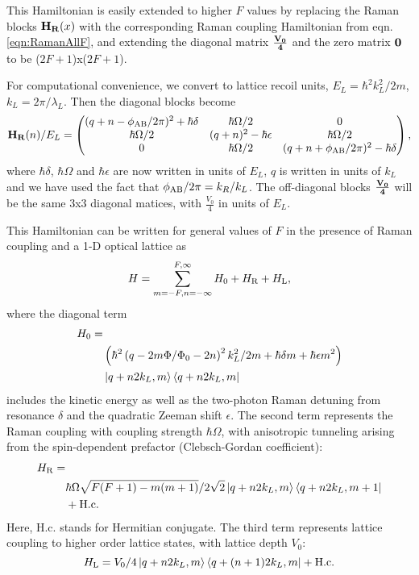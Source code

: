 This Hamiltonian is easily extended to higher $F$ values by replacing the Raman blocks ${\bf H_R}(x)$ with the corresponding Raman coupling Hamiltonian from eqn. \ref{eqn:RamanAllF}, and extending the diagonal matrix  ${\bf \frac{V_0}{4}}$ and the zero matrix $\bf 0$ to be ($2F+1$)x($2F+1$).

For computational convenience, we convert to lattice recoil units, $E_L=\hbar^2 k_L^2/2m$, $k_L=2\pi/\lambda_L$. Then the diagonal blocks become
 \begin{equation}
{\bf H_R}(n)/E_L = 
 \begin{pmatrix} (q + n -\phi_{\rm AB}/2\pi)^2+\hbar\delta & \hbar\Omega/2  &  0  \\ 
\hbar\Omega/2 & (q+n)^2 - \hbar\epsilon &  \hbar\Omega/2\\
 0 & \hbar\Omega/2 & (q + n +\phi_{\rm AB}/2\pi)^2 -\hbar\delta  \\
 \end{pmatrix} \\,
\end{equation}
where $\hbar\delta$, $\hbar\Omega$ and $\hbar\epsilon$ are now written in units of $E_L$, $q$ is written in units of $k_L$ and we have used the fact that $\phi_{\rm AB}/2\pi = k_R/k_L$. The off-diagonal blocks ${\bf \frac{V_0}{4}}$ will be the same 3x3 diagonal matices, with $\frac{V_0}{4}$ in units of $E_L$. 

This Hamiltonian can be written for general values of $F$ in the presence of Raman coupling and a 1-D optical lattice as
\begin{equation*}
H = \sum _{m=-F,n=-\infty}^{F,\infty}H_{0}+H_{\rm{R}}+H_{\rm{L}},
\end{equation*}
where the diagonal term
\begin{eqnarray*}
H_{0} =&\\
&\left(\hbar^2\left(q-2m\Phi/\Phi_0-2n\right)^2 k_L^2/2m+\hbar\delta m+\hbar\epsilon m^2 \right)\\
&\mathinner{|{q+n2k_L,m}\rangle}\mathinner{\langle{q+n2k_L,m}|}
\end{eqnarray*}
includes the kinetic energy as well as the two-photon Raman detuning from resonance $\delta$ and the quadratic Zeeman shift $\epsilon$. The second term represents the Raman coupling  with coupling strength $\hbar\Omega$, with anisotropic tunneling arising from the spin-dependent prefactor (Clebsch-Gordan coefficient):
\begin{eqnarray*}
H_{\rm{R}} =&\\
&\hbar\Omega\sqrt{F(F+1)-m(m+1)}/2\sqrt{2}\mathinner{|{q+n2k_L,m}\rangle}\mathinner{\langle{q+n2k_L,m+1}|}\\
&+\rm{H.c.}
\end{eqnarray*}
Here,  H.c. stands for Hermitian conjugate. The third term represents lattice coupling to higher order lattice states, with lattice depth $V_0$: 
\begin{equation*}
H_{\rm{L}} = V_0/4\mathinner{|{q+n2k_L,m}\rangle}\mathinner{\langle{q+(n+1)2k_L,m}|} +\rm{H.c.}
\end{equation*}

